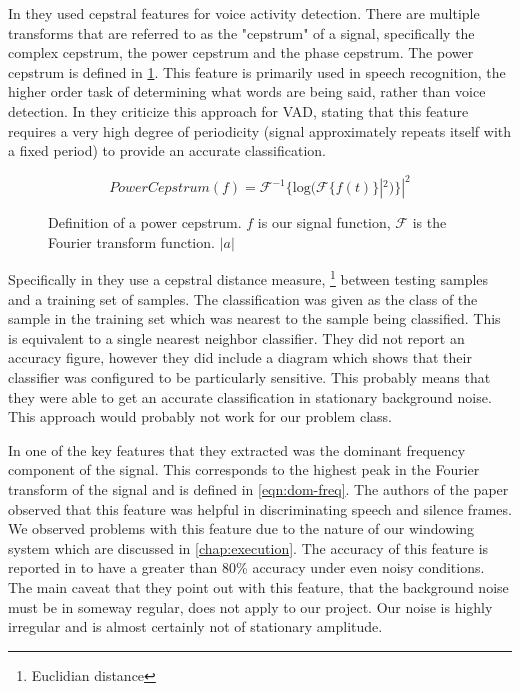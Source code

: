 \documentclass[ %
                    author={Sam Phippen},
                supervisor={Dr. Rafal Bogacz},
                     title={Real time voice activity detectors in noisy personal computing environments},
                  subtitle={},
                    degree={MEng},
                      year={2012} ]{thesis}
\begin{document}
In \cite{haigh} they used cepstral features for voice activity detection. There
are multiple transforms that are referred to as the "cepstrum" of a signal,
specifically the complex cepstrum, the power cepstrum and the phase
cepstrum\cite{childers}. The power cepstrum is defined in
\ref{eqn:power-cepstrum}. This feature is primarily used in speech recognition,
the higher order task of determining what words are being said, rather than
voice detection\cite{muda}. In \cite{atal} they criticize this approach for
VAD, stating that this feature requires a very high degree of periodicity
(signal approximately repeats itself with a fixed period) to provide an
accurate classification.

\begin{figure}
    $$PowerCepstrum(f)=\mathcal{F}^{-1}\{\mbox{log}(\mathcal{F}\{ f(t) \}|^2)\}|^2$$
    \caption{Definition of a power cepstrum. $f$ is our
    signal function, $\mathcal{F}$ is the Fourier transform function. $|a|$}
    \label{eqn:power-cepstrum}

\end{figure}

Specifically in \cite{haigh} they use a cepstral distance measure,
\footnote{Euclidian distance} between testing samples and a training set of
samples. The classification was given as the class of the sample in the
training set which was nearest to the sample being classified. This is
equivalent to a single nearest neighbor classifier. They did not report an
accuracy figure, however they did include a diagram which shows that their
classifier was configured to be particularly sensitive. This probably means
that they were able to get an accurate classification in stationary background
noise. This approach would probably not work for our problem class.

In \cite{moattar} one of the key features that they extracted was the dominant
frequency component of the signal. This corresponds to the highest peak in the
Fourier transform of the signal and is defined in \ref{eqn:dom-freq}. The
authors of the paper observed that this feature was helpful in discriminating
speech and silence frames. We observed problems with this feature due to the
nature of our windowing system which are discussed in \ref{chap:execution}. The
accuracy of this feature is reported in \cite{moattar} to have a greater than
80\% accuracy under even noisy conditions. The main caveat that they point out
with this feature, that the background noise must be in someway regular, does
not apply to our project. Our noise is highly irregular and is almost certainly
not of stationary amplitude.
\end{document}
